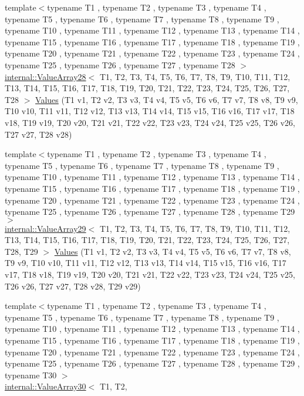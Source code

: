 \begin{DoxyCompactItemize}
\item 
{\footnotesize template$<$typename T1 , typename T2 , typename T3 , typename T4 , typename T5 , typename T6 , typename T7 , typename T8 , typename T9 , typename T10 , typename T11 , typename T12 , typename T13 , typename T14 , typename T15 , typename T16 , typename T17 , typename T18 , typename T19 , typename T20 , typename T21 , typename T22 , typename T23 , typename T24 , typename T25 , typename T26 , typename T27 , typename T28 $>$ }\\\hyperlink{classtesting_1_1internal_1_1ValueArray28}{internal\-::\-Value\-Array28}$<$ \-T1, \-T2, \*
\-T3, \-T4, \-T5, \-T6, \-T7, \-T8, \-T9, \*
\-T10, \-T11, \-T12, \-T13, \-T14, \-T15, \*
\-T16, \-T17, \-T18, \-T19, \-T20, \-T21, \*
\-T22, \-T23, \-T24, \-T25, \-T26, \-T27, \*
\-T28 $>$ \hyperlink{namespacetesting_a5785254e0510108d9d422e32ba18f170}{\-Values} (\-T1 v1, \-T2 v2, \-T3 v3, \-T4 v4, \-T5 v5, \-T6 v6, \-T7 v7, \-T8 v8, \-T9 v9, \-T10 v10, \-T11 v11, \-T12 v12, \-T13 v13, \-T14 v14, \-T15 v15, \-T16 v16, \-T17 v17, \-T18 v18, \-T19 v19, \-T20 v20, \-T21 v21, \-T22 v22, \-T23 v23, \-T24 v24, \-T25 v25, \-T26 v26, \-T27 v27, \-T28 v28)
\item 
{\footnotesize template$<$typename T1 , typename T2 , typename T3 , typename T4 , typename T5 , typename T6 , typename T7 , typename T8 , typename T9 , typename T10 , typename T11 , typename T12 , typename T13 , typename T14 , typename T15 , typename T16 , typename T17 , typename T18 , typename T19 , typename T20 , typename T21 , typename T22 , typename T23 , typename T24 , typename T25 , typename T26 , typename T27 , typename T28 , typename T29 $>$ }\\\hyperlink{classtesting_1_1internal_1_1ValueArray29}{internal\-::\-Value\-Array29}$<$ \-T1, \-T2, \*
\-T3, \-T4, \-T5, \-T6, \-T7, \-T8, \-T9, \*
\-T10, \-T11, \-T12, \-T13, \-T14, \-T15, \*
\-T16, \-T17, \-T18, \-T19, \-T20, \-T21, \*
\-T22, \-T23, \-T24, \-T25, \-T26, \-T27, \*
\-T28, \-T29 $>$ \hyperlink{namespacetesting_a3d8a9bd3f027d89ff2873e3f0ff396cb}{\-Values} (\-T1 v1, \-T2 v2, \-T3 v3, \-T4 v4, \-T5 v5, \-T6 v6, \-T7 v7, \-T8 v8, \-T9 v9, \-T10 v10, \-T11 v11, \-T12 v12, \-T13 v13, \-T14 v14, \-T15 v15, \-T16 v16, \-T17 v17, \-T18 v18, \-T19 v19, \-T20 v20, \-T21 v21, \-T22 v22, \-T23 v23, \-T24 v24, \-T25 v25, \-T26 v26, \-T27 v27, \-T28 v28, \-T29 v29)
\item 
{\footnotesize template$<$typename T1 , typename T2 , typename T3 , typename T4 , typename T5 , typename T6 , typename T7 , typename T8 , typename T9 , typename T10 , typename T11 , typename T12 , typename T13 , typename T14 , typename T15 , typename T16 , typename T17 , typename T18 , typename T19 , typename T20 , typename T21 , typename T22 , typename T23 , typename T24 , typename T25 , typename T26 , typename T27 , typename T28 , typename T29 , typename T30 $>$ }\\\hyperlink{classtesting_1_1internal_1_1ValueArray30}{internal\-::\-Value\-Array30}$<$ \-T1, \-T2, \*

\end{DoxyCompactItemize}
